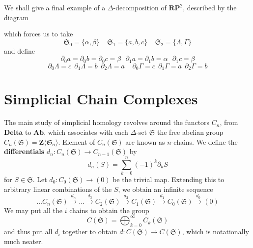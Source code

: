 \begin{example}
    We shall give a final example of a $\Delta$-decomposition of $\mathbf{R} \mathbf{P}^2$, described by the diagram
    \begin{center}
    \end{center}
    which forces us to take
    \[ \mathfrak{S}_0 = \{ \alpha, \beta \}\ \ \ \ \ \mathfrak{S}_1 = \{ a, b, c \}\ \ \ \ \ \mathfrak{S}_2 = \{ \Lambda, \Gamma \} \]
    and define
    \[ \partial_0 a = \partial_0 b = \partial_0 c = \beta\ \ \ \partial_1 a = \partial_1 b = \alpha\ \ \ \partial_1 c = \beta \]
    \[ \partial_0 \Lambda = c\ \ \partial_1 \Lambda = b\ \ \partial_2 \Lambda = a\ \ \ \ \ \partial_0 \Gamma = c\ \ \partial_1 \Gamma = a\ \ \partial_2 \Gamma = b \]
\end{example}


\section{Simplicial Chain Complexes}

The main study of simplicial homology revolves around the functors $C_n$, from $\textbf{Delta}$ to $\textbf{Ab}$, which associates with each $\Delta$-set $\mathfrak{S}$ the free abelian group $C_n(\mathfrak{S}) = \mathbf{Z} \langle \mathfrak{S}_n \rangle$. Element of $C_n(\mathfrak{S})$ are known as $n$-chains. We define the {\bf differentials} $d_n: C_n(\mathfrak{S}) \to C_{n-1}(\mathfrak{S})$ by
%
\[ d_n(S) = \sum_{k = 0}^n (-1)^k \partial_k S \]
%
for $S \in \mathfrak{S}$. Let $d_0: C_0(\mathfrak{S}) \to (0)$ be the trivial map. Extending this to arbitrary linear combinations of the $S$, we obtain an infinite sequence
%
\[ \dots C_n(\mathfrak{S}) \xrightarrow{d_n} \dots \xrightarrow{d_3} C_2(\mathfrak{S}) \xrightarrow{d_2} C_1(\mathfrak{S}) \xrightarrow{d_1} C_0(\mathfrak{S}) \xrightarrow{d_0} (0) \]
%
We may put all the $i$ chains to obtain the group
%
\[ C(\mathfrak{S}) = \bigoplus_{k = 0}^\infty C_k(\mathfrak{S}) \]
%
and thus put all $d_i$ together to obtain $d: C(\mathfrak{S}) \to C(\mathfrak{S})$, which is notationally much neater.

